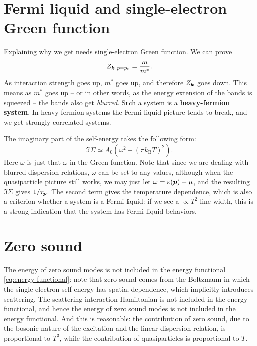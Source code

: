 \documentclass[hyperref, a4paper]{article}
\newcommand*{\concept}[1]{{\textbf{#1}}}
\newcommand*{\kB}{k_{\text{B}}}
\newcommand*{\pfermi}{p_{\text{F}}}
\begin{document}
\section{Fermi liquid and single-electron Green function}

Explaining why we get  
needs single-electron Green function.
We can prove 
\begin{equation}
    Z_{\vb*{k}}|_{p = \pfermi} = \frac{m}{m^*}.
\end{equation}
As interaction strength goes up, $m^*$ goes up, 
and therefore $Z_{\vb*{k}}$ goes down.
This means as $m^*$ goes up -- or in other words, 
as the energy extension of the bands is squeezed -- 
the bands also get \emph{blurred}.
Such a system is a \concept{heavy-fermion system}.
In heavy fermion systems the Fermi liquid picture tends to break,
and we get strongly correlated systems.

The imaginary part of the self-energy takes the following form: 
\begin{equation}
    \Im \Sigma \simeq A_0 (\omega^2 + (\pi \kB T)^2).
\end{equation}
Here $\omega$ is just that $\omega$ in the Green function.
Note that since we are dealing with blurred dispersion relations, 
$\omega$ can be set to any values, 
although when the quasiparticle picture still works, 
we may just let $\omega = \varepsilon(\vb*{p}) - \mu$, 
and the resulting $\Im \Sigma$ gives $1 / {\tau_{\vb*{p}}}$.
The second term gives the temperature dependence,
which is also a criterion whether a system is a Fermi liquid: 
if we see a $\propto T^2$ line width,
this is a strong indication that the system 
has Fermi liquid behaviors.

\section{Zero sound}

The energy of zero sound modes is not included in the energy functional \eqref{eq:energy-functional}:
note that zero sound comes from 
the Boltzmann in which the single-electron self-energy 
has spatial dependence, 
which implicitly introduces scattering.
The scattering interaction Hamiltonian is not included in the energy functional,
and hence the energy of zero sound modes is not included in the energy functional.
And this is reasonable: 
the contribution of zero sound, 
due to the bosonic nature of the excitation and the linear dispersion relation,
is proportional to $T^3$,
while the contribution of quasiparticles is proportional to $T$.
\end{document}
